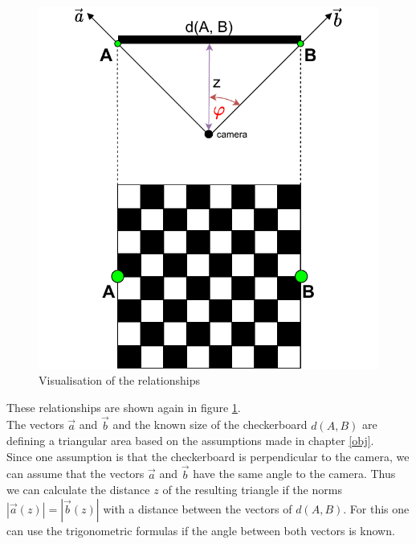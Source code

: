 \begin{figure}
    \vspace{\baselineskip}
    \centering
     \captionsetup{justification=centering}
     \begin{minipage}[b]{0.55\textwidth}
         \centering
         \includegraphics[width=\textwidth]{image/2/calc_line.pdf}
         \caption{Visualisation of the relationships}
         \label{fig:calc_line}\par
     \end{minipage}

\end{figure}

\newpage
These relationships are shown again in figure \ref{fig:calc_line}. \\The vectors $\vec{a}$ and $\vec{b}$ and the known size of the checkerboard $d(A, B)$ are defining a triangular area based on the assumptions  made in chapter \ref{obj}. \\

Since one assumption is that the checkerboard is perpendicular to the camera, we can assume that the vectors $\vec{a}$ and $\vec{b}$ have the same angle to the camera. Thus we can calculate the distance $z$ of the resulting triangle if the norms $|\vec{a}(z)|=|\vec{b}(z)|$ with a distance between the vectors of $d(A, B)$. For this one can use the trigonometric formulas if the angle between both vectors is known.\\

